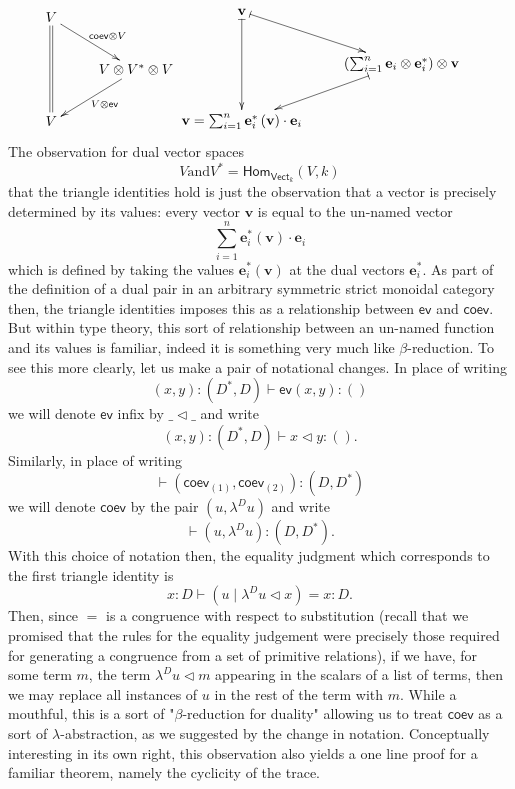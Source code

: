 \documentclass[pra,floatfix,
amsmath,superscriptaddress, 12pt]{article}
\theoremstyle{definition}
\newcommand{\evmap}{\mathsf{ev}}
\newcommand{\coev}{\mathsf{coev}}
\begin{document}
\begin{align*}
    \vcenter{\vbox{\xymatrix{
        V
        \ar@{=}[dd]
        \ar[dr]^{\coev\otimes V}
            \\
            &
            V\otimes V^{*}\otimes V
            \ar[dl]^{V\otimes\evmap}
                \\
        V
    }}}
        &
        \vcenter{\vbox{\xymatrix{
            \mathbf{v}
            \ar@{|->}[dd]
            \ar@{|->}[dr]
                \\
                &
                \left(\sum_{i=1}^{n}\mathbf{e}_{i}\otimes\mathbf{e}_{i}^{*}\right)\otimes\mathbf{v}
                \ar@{|->}[dl]
                    \\
            \mathbf{v}=\sum_{i=1}^{n}\mathbf{e}_{i}^{*}\left(\mathbf{v}\right)\cdot\mathbf{e}_{i}
    }}}
\end{align*}
%
The observation for dual vector spaces
\[
    V \mathrm{ and } V^*=\mathsf{Hom}_{\mathsf{Vect}_k}\left(V,k \right)
\]
that the triangle identities hold is just the observation that a vector is precisely determined by its values: every vector $\mathbf{v}$  is equal to the un-named vector
\[
\sum_{i=1}^{n}\mathbf{e}_i^*\left( \mathbf{v}\right)\cdot \mathbf{e}_i
\]
which is defined by taking the values $\mathbf{e}^*_{i}\left( \mathbf{v} \right)$ at the dual vectors $\mathbf{e}_i^*$.
As part of the definition of a dual pair in an arbitrary symmetric strict monoidal category then, the triangle identities imposes this as a relationship between $\evmap$ and $\coev$. But within type theory, this sort of relationship between an un-named function and its values is familiar, indeed it is something very much like $\beta$-reduction.
%
 To see this more clearly, let us make a pair of notational changes. In place of writing 
\[
\left(x,y\right):\left(D^{*},D\right)\vdash\evmap\left(x,y\right):\left(\right)
\]
we will denote $\evmap$ infix by $\_\triangleleft\_$ and write
\[
\left(x,y\right):\left(D^{*},D\right)\vdash x\triangleleft y:\left(\right).
\]
Similarly, in place of writing 
\[
\vdash\left(\coev_{\left(1\right)},\coev_{\left(2\right)}\right):\left(D,D^{*}\right)
\]
 we will denote $\coev$ by the pair $\left(u,\lambda^{D}u\right)$
and write
\[
\vdash\left(u,\lambda^{D}u\right):\left(D,D^{*}\right).
\]
With this choice of notation then, the equality judgment which corresponds to
the first triangle identity is 
\[
x:D\vdash\left( u \; |\; \lambda^{D}u\triangleleft x\right)=x:D.
\]
%
Then, since $=$ is a congruence with respect
to substitution (recall that we promised that the rules for the equality judgement were precisely those  required for generating a congruence from a set of primitive relations), if we have, for some term $m$, the term $\lambda^{D}u\triangleleft m$
appearing in the scalars of a list of terms, then we may replace all
instances of $u$ in the rest of the term with $m$. While a mouthful,
this is a sort of "$\beta$-reduction for duality" allowing us to treat $\coev$ as a sort of $\lambda$-abstraction, as we suggested by the change in notation. Conceptually interesting in its own right, this observation also yields a one line
proof for a familiar theorem, namely the cyclicity of the trace.
\end{document}
